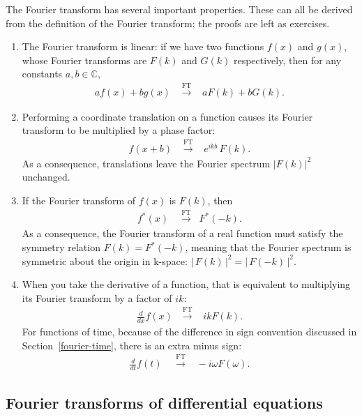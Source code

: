 \documentclass[10pt,a4paper]{article}
\begin{document}
The Fourier transform has several important properties.  These can all
be derived from the definition of the Fourier transform; the proofs
are left as exercises.

\begin{enumerate}
\item The Fourier transform is linear: if we have two functions $f(x)$
  and $g(x)$, whose Fourier transforms are $F(k)$ and $G(k)$
  respectively, then for any constants $a, b \in \mathbb{C}$,
  \begin{align}
    a f(x) + b g(x) \;\;\; \overset{\mathrm{FT}}{\longrightarrow} \;\;\;
    a F(k) + b G(k).
  \end{align}
  
\item Performing a coordinate translation on a function causes its
  Fourier transform to be multiplied by a phase factor:
  \begin{align}
    f(x+b) \;\;\; \overset{\mathrm{FT}}{\longrightarrow} \;\;\; e^{ikb} \, F(k).
  \end{align}
  As a consequence, translations leave the Fourier spectrum $|F(k)|^2$
  unchanged.

\item If the Fourier transform of $f(x)$ is $F(k)$, then
  \begin{align}
    f^*(x) \quad  \overset{\mathrm{FT}}{\longrightarrow} \;\; F^*(-k).
  \end{align}
  As a consequence, the Fourier transform of a real function must
  satisfy the symmetry relation $F(k) = F^*(-k)$, meaning that the
  Fourier spectrum is symmetric about the origin in k-space:
  $\big|\,F(k)\,\big|^2 = \big|\,F(-k)\,\big|^2.$

\item When you take the derivative of a function, that is equivalent
  to multiplying its Fourier transform by a factor of $ik$:
  \begin{align}
    \frac{d}{dx} f(x) \,\;\;  \overset{\mathrm{FT}}{\longrightarrow} \;\;\; ik F(k).
  \end{align}
  For functions of time, because of the difference in sign convention
  discussed in Section~\ref{fourier-time}, there is an extra minus
  sign:
  \begin{align}
    \frac{d}{dt} f(t) \;\;\;\;  \overset{\mathrm{FT}}{\longrightarrow} \;\;\; -i\omega F(\omega).
  \end{align}
\end{enumerate}

\subsection{Fourier transforms of differential equations}
\label{fourier-transforms-of-differential-equations}
\end{document}
